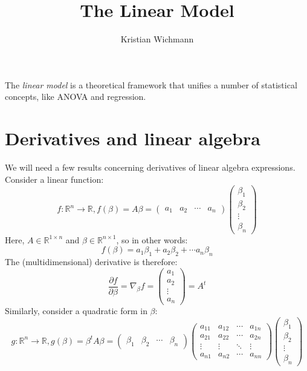 \documentclass[12pt, a4paper]{article}
\title{The Linear Model}
\author{Kristian Wichmann}
\begin{document}
\maketitle

The \textit{linear model} is a theoretical framework that unifies a number of statistical concepts, like ANOVA and regression.

\section{Derivatives and linear algebra}
We will need a few results concerning derivatives of linear algebra expressions. Consider a linear function:
\begin{equation}
f: \mathbb{R}^n\rightarrow\mathbb{R}, f(\beta)=A\beta=
\begin{pmatrix}
a_1 & a_2 & \cdots & a_n
\end{pmatrix}
\begin{pmatrix}
\beta_1 \\ \beta_2 \\ \vdots \\ \beta_n
\end{pmatrix}
\end{equation}
Here, $A\in\mathbb{R}^{1\times n}$ and $\beta\in\mathbb{R}^{n\times 1}$, so in other words:
\begin{equation}
f(\beta)=a_1\beta_1+a_2\beta_2+\cdots a_n\beta_n
\end{equation}
The (multidimensional) derivative is therefore:
\begin{equation}
\label{scalarproductdif}
\frac{\partial f}{\partial \beta}=\nabla_\beta f=
\begin{pmatrix}
a_1 \\ a_2 \\ \vdots \\ a_n
\end{pmatrix}
=A^t
\end{equation}
Similarly, consider a quadratic form in $\beta$:
\begin{equation}
g: \mathbb{R}^n\rightarrow\mathbb{R}, g(\beta)=\beta^t A\beta =
\begin{pmatrix}
\beta_1 & \beta_2 & \cdots & \beta_n
\end{pmatrix}
\begin{pmatrix}
a_{11} & a_{12} & \cdots & a_{1n} \\
a_{21} & a_{22} & \cdots & a_{2n} \\
\vdots & \vdots & \ddots & \vdots \\
a_{n1} & a_{n2} & \cdots & a_{nn}
\end{pmatrix}
\begin{pmatrix}
\beta_1 \\ \beta_2 \\ \vdots \\ \beta_n
\end{pmatrix}
\end{equation}
\end{document}
